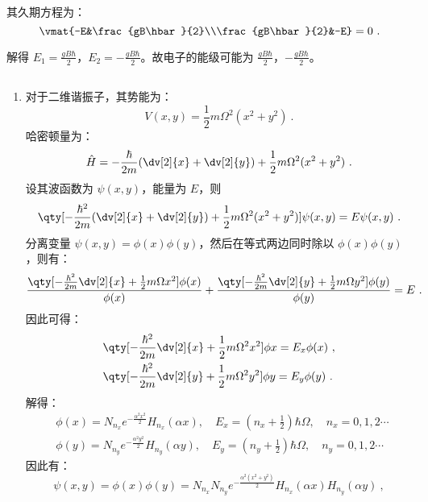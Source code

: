 \begin{enumerate}
其久期方程为：
\begin{equation}
\vmat{-E&\frac{gB\hbar}{2}\\\frac{gB\hbar}{2}&-E}=0~.
\end{equation}

解得 $E_{1}=\frac{gB\hbar}{2}$，$E_{2}=-\frac{gB\hbar}{2}$。故电子的能级可能为 $\frac{gB\hbar}{2}$，$-\frac{gB\hbar}{2}$。
\end{enumerate}
\subsection{ }
\begin{enumerate}
\item 对于二维谐振子，其势能为：
\begin{equation}
V(x,y)=\frac{1}{2}m\Omega^{2}(x^{2}+y^{2})~.
\end{equation}
哈密顿量为：
\begin{equation}
\hat{H}=-\frac{\hbar}{2m}(\dv[2]{x}+\dv[2]{y})+\frac{1}{2}m\Omega^{2}(x^{2}+y^{2})~.
\end{equation}
设其波函数为 $\psi(x,y)$，能量为 $E$，则
\begin{equation}
\qty[ -\frac{\hbar^{2}}{2m}(\dv[2]{x} + \dv[2]{y})+\frac{1}{2}m\Omega^{2}(x^{2}+y^{2})]\psi(x,y)=E\psi(x,y)~.
\end{equation}
分离变量 $\psi(x,y)=\phi(x)\phi(y)$，然后在等式两边同时除以 $\phi(x)\phi(y)$，则有：
\begin{equation}
\frac{\qty[-\frac{\hbar^{2}}{2m}\dv[2]{x}+\frac{1}{2}m\Omega x^{2}]\phi(x)}{\phi(x)}+\frac{\qty[-\frac{\hbar^{2}}{2m}\dv[2]{y}+\frac{1}{2}m\Omega y^{2}]\phi(y)}{\phi(y)}=E~.
\end{equation}
因此可得：
\begin{align}
&\qty[-\frac{\hbar^{2}}{2m}\dv[2]{x}+\frac{1}{2}m\Omega^{2}x^{2}]\phi{x}=E_{x}\phi(x)~,\\
&\qty[-\frac{\hbar^{2}}{2m}\dv[2]{y}+\frac{1}{2}m\Omega^{2}y^{2}]\phi{y}=E_{y}\phi(y)~.
\end{align}
解得：
\begin{align}
&\phi(x)=N_{n_{x}}e^{-\frac{\alpha^{2}x^{2}}{2}}H_{n_{x}}(\alpha x),\quad E_{x}=(n_{x}+\frac{1}{2})\hbar \Omega,\quad n_{x}=0,1,2\cdots~ \\
&\phi(y)=N_{n_{y}}e^{-\frac{\alpha^{2}y^{2}}{2}}H_{n_{y}}(\alpha y),\quad E_{y}=(n_{y}+\frac{1}{2})\hbar \Omega,\quad n_{y}=0,1,2\cdots~
\end{align}
因此有：
\begin{equation}
\psi(x,y)=\phi(x)\phi(y)=N_{n_{x}}N_{n_{y}}e^{-\frac{\alpha^{2}(x^{2}+y^{2})}{2}}H_{n_{x}}(\alpha x)H_{n_{y}}(\alpha y)~,

\end{equation}
\end{enumerate}

